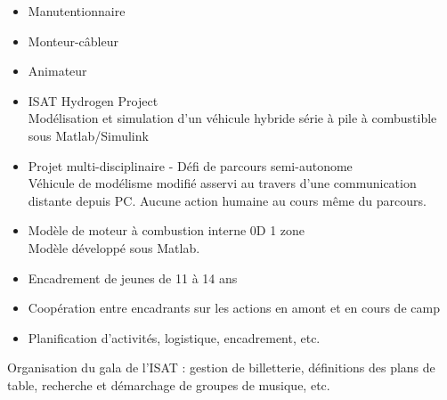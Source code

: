 \documentclass[10pt,a4paper,ragged2e,withhyper,normalphoto]{altacv}
\begin{document}
\begin{paracol}{2}
\divider

\begin{itemize}
	\item Manutentionnaire
	\item Monteur-câbleur
	\item Animateur
\end{itemize}

\medskip


\begin{itemize}
	\item ISAT Hydrogen Project\\%
	Modélisation et simulation d'un véhicule hybride série à pile à combustible sous Matlab/Simulink
	\item Projet multi-disciplinaire - Défi de parcours semi-autonome\\%
	Véhicule de modélisme modifié asservi au travers d'une communication distante depuis PC. Aucune action humaine au cours même du parcours.
	\item Modèle de moteur à combustion interne 0D 1 zone\\%
	Modèle développé sous Matlab.
\end{itemize}


\medskip


\begin{itemize}
	\item Encadrement de jeunes de 11 à 14 ans
	\item Coopération entre encadrants sur les actions en amont et en cours de camp
	\item Planification d'activités, logistique, encadrement, etc.
\end{itemize}

Organisation du gala de l'ISAT : gestion de billetterie, définitions des plans de table, recherche et démarchage de groupes de musique, etc.


\end{paracol}
\end{document}
